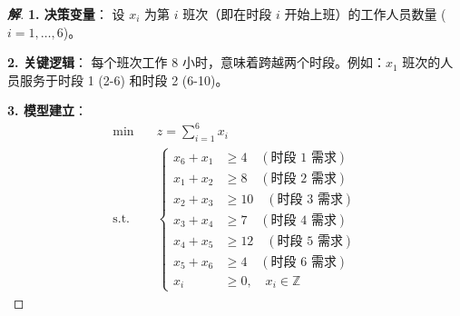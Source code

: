 \documentclass[a4paper,12pt]{ctexart} %
\newenvironment{solution}{\begin{proof}[\textbf{解}]}{\end{proof}}
\begin{document}
	\begin{solution}
		\textbf{1. 决策变量}：
		设 $x_i$ 为第 $i$ 班次（即在时段 $i$ 开始上班）的工作人员数量 ($i=1,\dots,6$)。
		
		\textbf{2. 关键逻辑}：
		每个班次工作 8 小时，意味着跨越两个时段。例如：$x_1$ 班次的人员服务于时段 1 (2-6) 和时段 2 (6-10)。
		
		\textbf{3. 模型建立}：
		\begin{equation}
			\begin{aligned}
				\min \quad & z = \sum_{i=1}^{6} x_i \\
				\text{s.t.} \quad & \left\{
				\begin{aligned}
					x_6 + x_1 &\ge 4 \quad (\text{时段 1 需求}) \\
					x_1 + x_2 &\ge 8 \quad (\text{时段 2 需求}) \\
					x_2 + x_3 &\ge 10 \quad (\text{时段 3 需求}) \\
					x_3 + x_4 &\ge 7 \quad (\text{时段 4 需求}) \\
					x_4 + x_5 &\ge 12 \quad (\text{时段 5 需求}) \\
					x_5 + x_6 &\ge 4 \quad (\text{时段 6 需求}) \\
					x_i &\ge 0, \quad x_i \in \mathbb{Z}
				\end{aligned}
				\right.
			\end{aligned}
		\end{equation}
	\end{solution}
	
\end{document}
